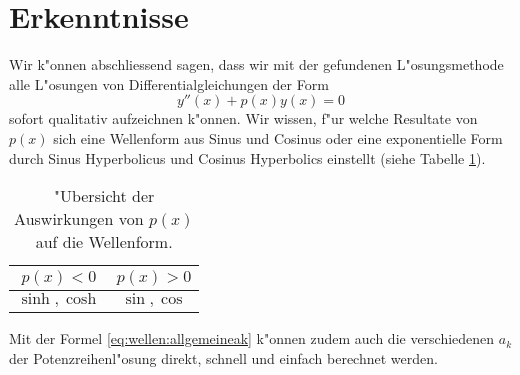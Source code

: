 \section{Erkenntnisse}
Wir k"onnen abschliessend sagen, dass wir mit der gefundenen L"osungsmethode 
alle L"osungen von Differentialgleichungen der Form 
\begin{equation*}
	y''(x)+p(x)y(x) = 0
\end{equation*}
sofort qualitativ aufzeichnen k"onnen.
%
Wir wissen, f"ur welche Resultate von 
$p(x)$ sich eine Wellenform aus Sinus und Cosinus oder eine exponentielle Form 
durch Sinus Hyperbolicus und Cosinus Hyperbolics einstellt (siehe Tabelle 
\ref{tab:wellen:formoverview}).
\begin{table}
	\centering
	\begin{tabular}{ c | c }
		$p(x) < 0$ & $p(x) > 0$ \\\hline
		$\sinh, \cosh$ & $\sin, \cos$
	\end{tabular}
	\caption{"Ubersicht der Auswirkungen von $p(x)$ auf die Wellenform.}
	\label{tab:wellen:formoverview}
\end{table}
Mit der Formel \eqref{eq:wellen:allgemeineak} k"onnen zudem auch die 
verschiedenen $a_k$ der Potenzreihenl"osung direkt, schnell und einfach 
berechnet werden.

